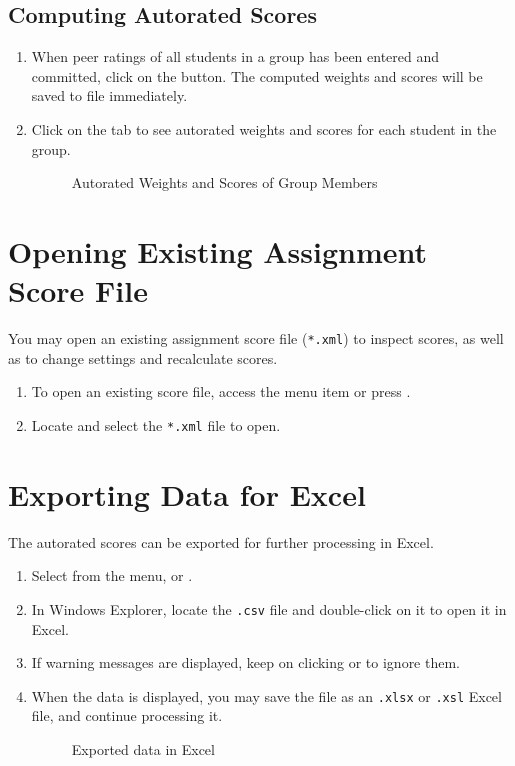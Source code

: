 \documentclass[a4paper,11pt]{refart}
\begin{document}
	\subsection{Computing Autorated Scores}
	\begin{enumerate}
		\item When peer ratings of all students in a group has been entered and committed, click on the  button. The computed weights and scores will be saved to file immediately.
		\item Click on the  tab to see autorated weights and scores for each student in the group.
		
		\begin{figure}[hbt!]
			\caption{Autorated Weights and Scores of Group Members}
		\end{figure}
		
	\end{enumerate}
	
	\section{Opening Existing Assignment Score File}
	You may open an existing assignment score file (\texttt{*.xml}) to inspect scores, as well as to change settings and recalculate scores.
	\begin{enumerate}
		\item To open an existing score file, access the menu item  or press .
		\item Locate and select the \texttt{*.xml} file to open.
	\end{enumerate}
	
	\section{Exporting Data for Excel}
	The autorated scores can be exported for further processing in Excel.
	\begin{enumerate}
		\item Select  from the menu, or .
		\item In Windows Explorer, locate the \texttt{.csv} file and double-click on it to open it in Excel.
		\item If warning messages are displayed, keep on clicking  or  to ignore them.
		\item When the data is displayed, you may save the file as an \texttt{.xlsx} or \texttt{.xsl} Excel file, and continue processing it.
		
		\begin{figure}[hbt!]
			\caption{Exported data in Excel}
		\end{figure}
		
	\end{enumerate}
	
	
	
\end{document}
